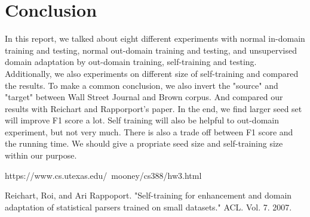 \documentclass[journal, a4paper]{IEEEtran}
\begin{document}
\section{Conclusion}\label{conclude}
	In this report, we talked about eight different experiments with normal in-domain training and testing, normal out-domain training and testing, and unsupervised domain adaptation by out-domain training, self-training and testing. Additionally, we also experiments on different size of self-training and compared the results. To make a common conclusion, we also invert the "source" and "target" between Wall Street Journal and Brown corpus. And compared our results with Reichart and Rapporport's paper. In the end, we find larger seed set will improve F1 score a lot. Self training will also be helpful to out-domain experiment, but not very much. There is also a trade off between F1 score and the running time. We should give a propriate seed size and self-training size within our purpose.
\begin{thebibliography}{5}

	https://www.cs.utexas.edu/~mooney/cs388/hw3.html
	
	Reichart, Roi, and Ari Rappoport. "Self-training for enhancement and domain adaptation of statistical parsers trained on small datasets." ACL. Vol. 7. 2007.

\end{thebibliography}


\end{document}
